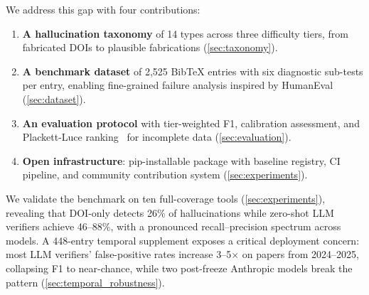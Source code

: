 We address this gap with four contributions:
\begin{enumerate}
    \item \textbf{A hallucination taxonomy} of 14 types across three difficulty tiers, from fabricated DOIs to plausible fabrications (\cref{sec:taxonomy}).
    \item \textbf{A benchmark dataset} of 2,525 BibTeX entries with six diagnostic sub-tests per entry, enabling fine-grained failure analysis inspired by HumanEval~\citep{humaneval} (\cref{sec:dataset}).
    \item \textbf{An evaluation protocol} with tier-weighted F1, calibration assessment, and Plackett-Luce ranking~\citep{luce1959,plackett1975} for incomplete data (\cref{sec:evaluation}).
    \item \textbf{Open infrastructure}: pip-installable package with baseline registry, CI pipeline, and community contribution system (\cref{sec:experiments}).
\end{enumerate}

We validate the benchmark on ten full-coverage tools (\cref{sec:experiments}), revealing that DOI-only detects 26\% of hallucinations while zero-shot LLM verifiers achieve 46--88\%, with a pronounced recall--precision spectrum across models.
A 448-entry temporal supplement exposes a critical deployment concern: most LLM verifiers' false-positive rates increase 3--5$\times$ on papers from 2024--2025, collapsing F1 to near-chance, while two post-freeze Anthropic models break the pattern (\cref{sec:temporal_robustness}).
